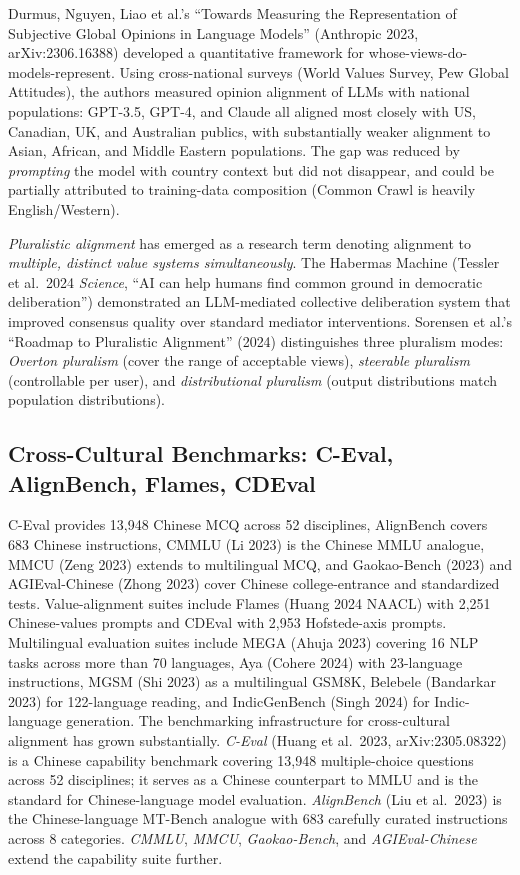 \documentclass{article}
\begin{document}
Durmus, Nguyen, Liao et al.'s ``Towards Measuring the Representation of Subjective Global Opinions in Language Models'' (Anthropic 2023, arXiv:2306.16388) developed a quantitative framework for whose-views-do-models-represent. Using cross-national surveys (World Values Survey, Pew Global Attitudes), the authors measured opinion alignment of LLMs with national populations: GPT-3.5, GPT-4, and Claude all aligned most closely with US, Canadian, UK, and Australian publics, with substantially weaker alignment to Asian, African, and Middle Eastern populations. The gap was reduced by \emph{prompting} the model with country context but did not disappear, and could be partially attributed to training-data composition (Common Crawl is heavily English/Western).

\emph{Pluralistic alignment} has emerged as a research term denoting alignment to \emph{multiple, distinct value systems simultaneously}. The Habermas Machine (Tessler et al.~2024 \emph{Science}, ``AI can help humans find common ground in democratic deliberation'') demonstrated an LLM-mediated collective deliberation system that improved consensus quality over standard mediator interventions. Sorensen et al.'s ``Roadmap to Pluralistic Alignment'' (2024) distinguishes three pluralism modes: \emph{Overton pluralism} (cover the range of acceptable views), \emph{steerable pluralism} (controllable per user), and \emph{distributional pluralism} (output distributions match population distributions).

\subsection{Cross-Cultural Benchmarks: C-Eval, AlignBench, Flames, CDEval}\label{cross-cultural-benchmarks-c-eval-alignbench-flames-cdeval}

C-Eval \citep{huang20232023} provides 13,948 Chinese MCQ across 52 disciplines, AlignBench \citep{liu2023statisticalrejecti} covers 683 Chinese instructions, CMMLU (Li 2023) is the Chinese MMLU analogue, MMCU (Zeng 2023) extends to multilingual MCQ, and Gaokao-Bench (2023) and AGIEval-Chinese (Zhong 2023) cover Chinese college-entrance and standardized tests. Value-alignment suites include Flames (Huang 2024 NAACL) with 2,251 Chinese-values prompts and CDEval \citep{wang2024cdevalabenchmarkfo} with 2,953 Hofstede-axis prompts. Multilingual evaluation suites include MEGA (Ahuja 2023) covering 16 NLP tasks across more than 70 languages, Aya (Cohere 2024) with 23-language instructions, MGSM (Shi 2023) as a multilingual GSM8K, Belebele (Bandarkar 2023) for 122-language reading, and IndicGenBench (Singh 2024) for Indic-language generation. The benchmarking infrastructure for cross-cultural alignment has grown substantially. \emph{C-Eval} (Huang et al.~2023, arXiv:2305.08322) is a Chinese capability benchmark covering 13,948 multiple-choice questions across 52 disciplines; it serves as a Chinese counterpart to MMLU and is the standard for Chinese-language model evaluation. \emph{AlignBench} (Liu et al.~2023) is the Chinese-language MT-Bench analogue with 683 carefully curated instructions across 8 categories. \emph{CMMLU}, \emph{MMCU}, \emph{Gaokao-Bench}, and \emph{AGIEval-Chinese} extend the capability suite further.
\end{document}

